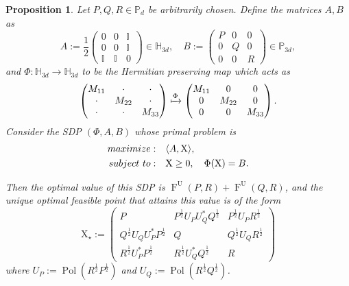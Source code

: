 \documentclass[12pt]{article}
\newtheorem{prop}[theorem]{Proposition}
\theoremstyle{definition}
\newcommand{\Fu}[2]{\operatorname{F}^\mathrm{U}\!\left(#1, #2\right)}
\begin{document}
\begin{theorembox}
\begin{prop}  \label{Prop:TotalFidelitySDP}
    Let $P,Q,R \in \mathbb P_d$ be arbitrarily chosen. Define the matrices $A, B$ as
    \begin{equation} \label{Eqn:AandB}
A := \frac{1}{2} \begin{pmatrix}
0 & 0 & \mathbb I \\
0 & 0 & \mathbb I \\
\mathbb I & \mathbb I & 0
\end{pmatrix} \in \mathbb H_{3d}, \quad B := \begin{pmatrix}
P & 0 & 0 \\
0 & Q & 0 \\
0 & 0 & R
\end{pmatrix} \in \mathbb P_{3d},
\end{equation}
and $\Phi : \mathbb H_{3d} \to  \mathbb H_{3d}$ to be the Hermitian preserving map which acts as
\begin{equation}
    \begin{pmatrix}
    M_{11} & \cdot & \cdot \\
    \cdot & M_{22} & \cdot \\
    \cdot & \cdot & M_{33}
    \end{pmatrix} \xmapsto{\Phi} \begin{pmatrix}
    M_{11} & 0 & 0 \\
    0 & M_{22} & 0 \\
    0 & 0 & M_{33}
    \end{pmatrix}.
\end{equation}
Consider the SDP $(\Phi, A, B)$ whose primal problem is
\begin{equation}
    \begin{aligned}
        \rm{maximize}: \quad &\langle A,  \mathrm{X} \rangle, \\
        \rm{subject} \,\, \rm{to} : \quad & \mathrm{X} \geq 0, \quad \Phi( \mathrm{X} ) = B.                
    \end{aligned}
\end{equation}

Then the optimal value of this SDP is $ \Fu{P}{R} + \Fu{Q}{R}$, and the unique optimal feasible point that attains this value is of the form
\begin{equation}
    \mathrm{X}_\star := 
    \begin{pmatrix}
    P & P^{\frac12} U_P U_Q^* Q^{\frac12} & P^{\frac12} U_P R^{\frac12} \\
    Q^{\frac12} U_Q U_P^* P^{\frac12} & Q & Q^{\frac12} U_Q R^{\frac12} \\
    R^{\frac12} U_P^* P^{\frac12} & R^{\frac12} U_Q^* Q^{\frac12} & R 
    \end{pmatrix}
\end{equation}
\textit{where $U_P := \operatorname{Pol}\left(R ^{\frac12} P ^{\frac12} \right)$ and $U_Q := \operatorname{Pol}\left(R ^{\frac12} Q ^{\frac12} \right)$}.

\end{prop}
\end{theorembox}
\end{document}
